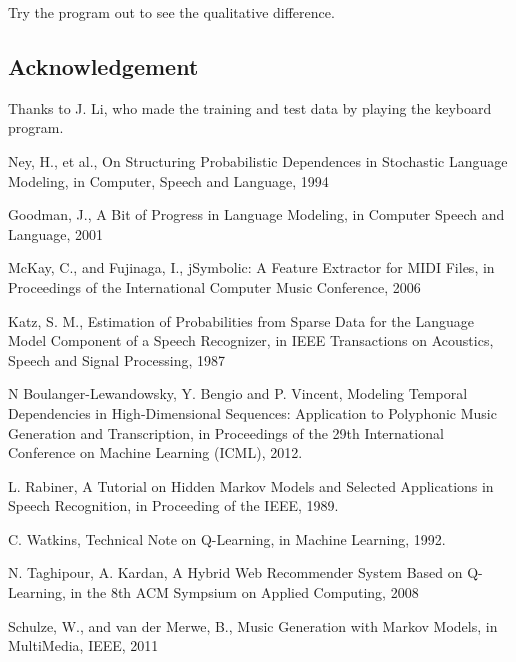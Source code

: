 \documentclass{article}
\begin{document}
Try the program out to see the qualitative difference.

\subsection*{Acknowledgement}
Thanks to J. Li, who made the training and test data by playing the keyboard program.

\begin{thebibliography}{9}%

Ney, H., et al., On Structuring Probabilistic Dependences in Stochastic Language Modeling, in Computer, Speech and Language, 1994

Goodman, J., A Bit of Progress in Language Modeling, in Computer Speech and Language, 2001

McKay, C., and Fujinaga, I., jSymbolic: A Feature Extractor for MIDI Files, in Proceedings of the International Computer Music Conference, 2006

Katz, S. M., Estimation of Probabilities from Sparse Data for the Language Model Component of a Speech Recognizer, in IEEE Transactions on Acoustics, Speech and Signal Processing, 1987

N Boulanger-Lewandowsky, Y. Bengio and P. Vincent, Modeling Temporal Dependencies in High-Dimensional Sequences: Application to Polyphonic Music Generation and Transcription, in Proceedings of the 29th International Conference on Machine Learning (ICML), 2012.

L. Rabiner, A Tutorial on Hidden Markov Models and Selected Applications in Speech Recognition, in Proceeding of the IEEE, 1989.

C. Watkins, Technical Note on Q-Learning, in Machine Learning, 1992.

N. Taghipour, A. Kardan, A Hybrid Web Recommender System Based on Q-Learning, in the 8th ACM Sympsium on Applied Computing, 2008

Schulze, W., and van der Merwe, B., Music Generation with Markov Models, in MultiMedia, IEEE, 2011

\end{thebibliography}
\end{document}
